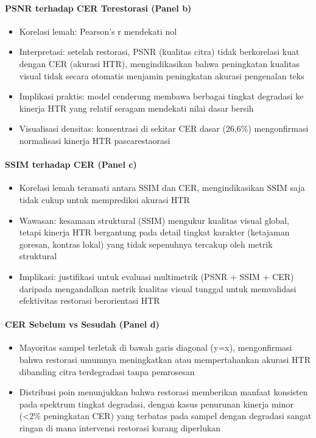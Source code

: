 \documentclass[12pt,a4paper]{article}
\begin{document}
\paragraph{PSNR terhadap CER Terestorasi (Panel b)}
\begin{itemize}[nosep]
    \item Korelasi lemah: Pearson's r mendekati nol
    \item Interpretasi: setelah restorasi, PSNR (kualitas citra) tidak berkorelasi kuat dengan CER (akurasi HTR), mengindikasikan bahwa peningkatan kualitas visual tidak secara otomatis menjamin peningkatan akurasi pengenalan teks
    \item Implikasi praktis: model cenderung membawa berbagai tingkat degradasi ke kinerja HTR yang relatif seragam mendekati nilai dasar bersih
    \item Visualisasi densitas: konsentrasi di sekitar CER dasar (26,6\%) mengonfirmasi normalisasi kinerja HTR pascarestaorasi
\end{itemize}

\paragraph{SSIM terhadap CER (Panel c)}
\begin{itemize}[nosep]
    \item Korelasi lemah teramati antara SSIM dan CER, mengindikasikan SSIM saja tidak cukup untuk memprediksi akurasi HTR
    \item Wawasan: kesamaan struktural (SSIM) mengukur kualitas visual global, tetapi kinerja HTR bergantung pada detail tingkat karakter (ketajaman goresan, kontras lokal) yang tidak sepenuhnya tercakup oleh metrik struktural
    \item Implikasi: justifikasi untuk evaluasi multimetrik (PSNR + SSIM + CER) daripada mengandalkan metrik kualitas visual tunggal untuk memvalidasi efektivitas restorasi berorientasi HTR
\end{itemize}

\paragraph{CER Sebelum vs Sesudah (Panel d)}
\begin{itemize}[nosep]
    \item Mayoritas sampel terletak di bawah garis diagonal (y=x), mengonfirmasi bahwa restorasi umumnya meningkatkan atau mempertahankan akurasi HTR dibanding citra terdegradasi tanpa pemrosesan
    \item Distribusi poin menunjukkan bahwa restorasi memberikan manfaat konsisten pada spektrum tingkat degradasi, dengan kasus penurunan kinerja minor (<2\% peningkatan CER) yang terbatas pada sampel dengan degradasi sangat ringan di mana intervensi restorasi kurang diperlukan
\end{itemize}
\end{document}
